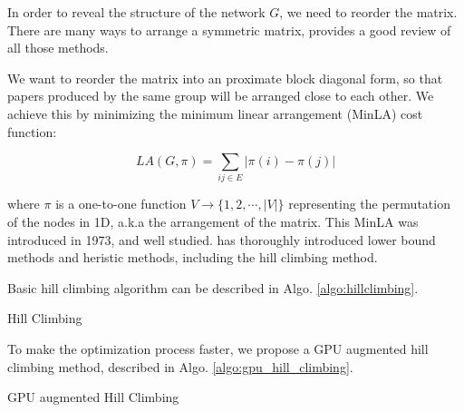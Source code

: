 In order to reveal the structure of the network $G$, we need to reorder the matrix.
There are many ways to arrange a symmetric matrix, \cite{behrisch_matrix_2016} provides a good review of all those methods.

We want to reorder the matrix into an proximate block diagonal form, so that papers produced by the same group will be arranged close to each other.
We achieve this by minimizing the minimum linear arrangement (MinLA) cost function:

\begin{equation}
    LA(G, \pi) = \sum_{ij \in E} |\pi(i) - \pi(j)|
\end{equation}

where $\pi$ is a one-to-one function $V \rightarrow \{1,2,\cdots,|V|\}$ representing the permutation of the nodes in 1D, a.k.a the arrangement of the matrix.
This MinLA was introduced in 1973, and well studied.
\cite{petit_experiments_2004} has thoroughly introduced lower bound methods and heristic methods, including the hill climbing method.

Basic hill climbing algorithm can be described in Algo. \ref{algo:hillclimbing}. 

\begin{algorithm}
    \caption{Hill Climbing}\label{algo:hillclimbing}
\end{algorithm}

To make the optimization process faster, we propose a GPU augmented hill climbing method, described in Algo. \ref{algo:gpu_hill_climbing}.

\begin{algorithm}
    \caption{GPU augmented Hill Climbing}\label{algo:gpu_hill_climbing}
\end{algorithm}

